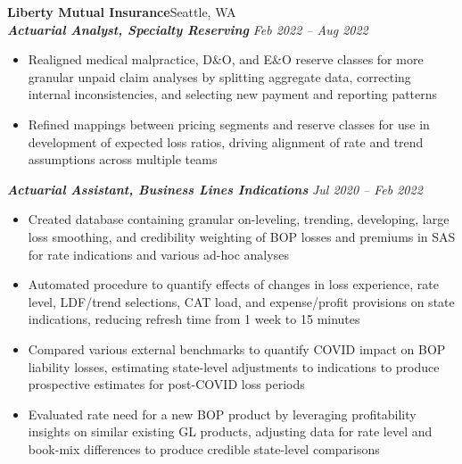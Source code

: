 \documentclass[11pt,letterpaper]{article}
\newcommand{\smallspace}{\vspace{6pt}}
\begin{document}
\smallspace
\textbf{Liberty Mutual Insurance}\hfill Seattle, WA \\
\textbf{\textit{Actuarial Analyst, Specialty Reserving}} \hfill \textit{Feb 2022 -- Aug 2022} \\
\begin{itemize}
	\item Realigned medical malpractice, D\&O, and E\&O reserve classes for more granular unpaid claim analyses by splitting aggregate data, correcting internal inconsistencies, and selecting new payment and reporting patterns
	\item Refined mappings between pricing segments and reserve classes for use in development of expected loss ratios, driving alignment of rate and trend assumptions across multiple teams
\end{itemize}
\textbf{\textit{Actuarial Assistant, Business Lines Indications}} \hfill \textit{Jul 2020 -- Feb 2022}
\begin{itemize}
	\item Created database containing granular on-leveling, trending, developing, large loss smoothing, and credibility weighting of BOP losses and premiums in SAS for rate indications and various ad-hoc analyses
	\item Automated procedure to quantify effects of changes in loss experience, rate level, LDF/trend selections, CAT load, and expense/profit provisions on state indications, reducing refresh time from 1 week to 15 minutes
	\item Compared various external benchmarks to quantify COVID impact on BOP liability losses, estimating state-level adjustments to indications to produce prospective estimates for post-COVID loss periods
	\item Evaluated rate need for a new BOP product by leveraging profitability insights on similar existing GL products, adjusting data for rate level and book-mix differences to produce credible state-level comparisons
\end{itemize}
\smallspace
\end{document}
